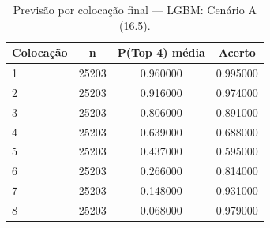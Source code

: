 \begin{table}[htbp]
\caption{Previsão por colocação final — LGBM: Cenário A (16.5).}
\label{tab:errcol}
\centering
\small
\begin{tabular}{lccc}
\toprule
Colocação & n & P(Top 4) média & Acerto \\
\midrule
1 & 25203 & 0.960000 & 0.995000 \\
2 & 25203 & 0.916000 & 0.974000 \\
3 & 25203 & 0.806000 & 0.891000 \\
4 & 25203 & 0.639000 & 0.688000 \\
5 & 25203 & 0.437000 & 0.595000 \\
6 & 25203 & 0.266000 & 0.814000 \\
7 & 25203 & 0.148000 & 0.931000 \\
8 & 25203 & 0.068000 & 0.979000 \\
\bottomrule
\end{tabular}
\end{table}
